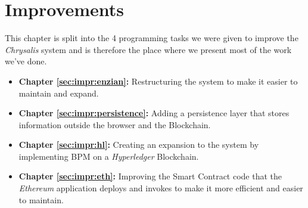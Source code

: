 %
\chapter{Improvements}
\label{sec:impr}

This chapter is split into the 4 programming tasks we were given to improve the \emph{Chrysalis} system and is therefore the place where we present most of the work we've done.
\begin{itemize}
    \item \textbf{Chapter \ref{sec:impr:enzian}:} Restructuring the system to make it easier to maintain and expand.
    \item \textbf{Chapter \ref{sec:impr:persistence}:} Adding a persistence layer that stores information outside the browser and the Blockchain.
    \item \textbf{Chapter \ref{sec:impr:hl}:} Creating an expansion to the system by implementing BPM on a \emph{Hyperledger} Blockchain.
    \item \textbf{Chapter \ref{sec:impr:eth}:} Improving the Smart Contract code that the \emph{Ethereum} application deploys and invokes to make it more efficient and easier to maintain.
\end{itemize}
